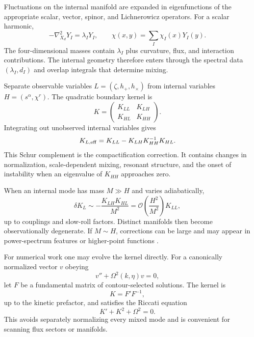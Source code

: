 \documentclass[aps,prd,twocolumn,superscriptaddress,nofootinbib,longbibliography]{revtex4-2}
\begin{document}
Fluctuations on the internal manifold are expanded in eigenfunctions of the appropriate scalar, vector, spinor, and Lichnerowicz operators. For a scalar harmonic,
\begin{equation}
-\nabla_{X_d}^2Y_I=\lambda_IY_I,\qquad
\chi(x,y)=\sum_I\chi_I(x)Y_I(y).
\end{equation}
The four-dimensional masses contain $\lambda_I$ plus curvature, flux, and interaction contributions. The internal geometry therefore enters through the spectral data $(\lambda_I,d_I)$ and overlap integrals that determine mixing.

Separate observable variables $L=(\zeta,h_+,h_\times)$ from internal variables $H=(s^\alpha,\chi^r)$. The quadratic boundary kernel is
\begin{equation}
K=\begin{pmatrix}K_{LL}&K_{LH}\\K_{HL}&K_{HH}\end{pmatrix}.
\end{equation}
Integrating out unobserved internal variables gives
\begin{equation}
K_{L,\rm eff}=K_{LL}-K_{LH}K_{HH}^{-1}K_{HL}.
\label{eq:schur}
\end{equation}
This Schur complement is the compactification correction. It contains changes in normalization, scale-dependent mixing, resonant structure, and the onset of instability when an eigenvalue of $K_{HH}$ approaches zero.

When an internal mode has mass $M\gg H$ and varies adiabatically,
\begin{equation}
\delta K_L\sim-\frac{K_{LH}K_{HL}}{M^2}
=\mathcal O\left(\frac{H^2}{M^2}\right)K_{LL},
\end{equation}
up to couplings and slow-roll factors. Distinct manifolds then become observationally degenerate. If $M\sim H$, corrections can be large and may appear in power-spectrum features or higher-point functions \cite{ArkaniHamedMaldacena2015}.

For numerical work one may evolve the kernel directly. For a canonically normalized vector $v$ obeying
\begin{equation}
v''+\Omega^2(k,\eta)v=0,
\end{equation}
let $F$ be a fundamental matrix of contour-selected solutions. The kernel is
\begin{equation}
K=F'F^{-1},
\end{equation}
up to the kinetic prefactor, and satisfies the Riccati equation
\begin{equation}
K'+K^2+\Omega^2=0.
\label{eq:riccati}
\end{equation}
This avoids separately normalizing every mixed mode and is convenient for scanning flux sectors or manifolds.
\end{document}
